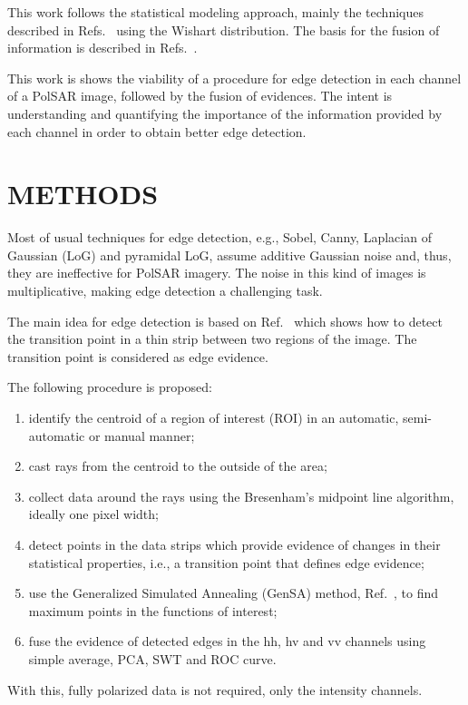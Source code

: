 \documentclass[a4paper,12pt]{article}
\begin{document}
This work follows the statistical modeling approach, mainly the techniques described in Refs.~\cite{fbgm, nhfc} using the Wishart distribution.
The basis for the fusion of information is described in Refs.~\cite{sg,mit}. 

This work is shows the viability of a procedure for edge detection in each channel of a PolSAR image, followed by the fusion of evidences. 
The intent is understanding and quantifying the importance of the information provided by each channel in order to obtain better edge detection.

\section{METHODS} \label{sec:method}

Most of usual techniques for edge detection, e.g., 
Sobel, Canny, Laplacian of Gaussian (LoG) and pyramidal LoG, assume additive Gaussian noise and, thus, they are ineffective for PolSAR imagery.
The noise in this kind of images is multiplicative, making edge detection a challenging task.

The main idea for edge detection is based on Ref.~\cite{nhfc, gmbf} which shows how to detect the transition point in a thin strip between two regions of the image. 
The transition point is considered as edge evidence. 

The following procedure is proposed:
\begin{enumerate}
	\item identify the centroid of a region of interest (ROI) in an automatic, semi-automatic or manual manner;
	\item cast rays from the centroid to the outside of the area;
	\item collect data around the rays using the  Bresenham's midpoint line algorithm, ideally one pixel width;
	\item detect points in the data strips which provide evidence of changes in their statistical properties, i.e., a transition point that defines edge evidence;
	\item use the Generalized Simulated Annealing (GenSA) method, Ref.~\cite{xgsh}, to find maximum points in the functions of interest;
	\item fuse the evidence of detected edges in the hh, hv and vv channels using simple average, PCA, SWT and ROC curve.
\end{enumerate}
With this, fully polarized data is not required, only the intensity channels.
	
\end{document}
